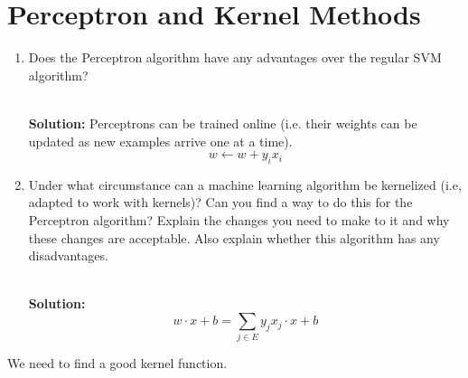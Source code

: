 
\section{Perceptron and Kernel Methods}
\begin{enumerate}
\item Does the Perceptron algorithm have any advantages over the regular SVM algorithm?

\ \\{\bf Solution:} Perceptrons can be trained online (i.e. their weights can be updated as new examples arrive one at a time).
\[
w \leftarrow w + y_ix_i
\]

\item Under what circumstance can a machine learning algorithm be kernelized (i.e, adapted to work with kernels)? Can you find a way to do this for the Perceptron algorithm? Explain the changes you need to make to it and why these changes are acceptable. Also explain whether this algorithm has any disadvantages.

\ \\{\bf Solution:}
\[
w \cdot x + b = \sum_{j\in E} y_j x_j \cdot x + b
\]
\end{enumerate}

We need to find a good kernel function.